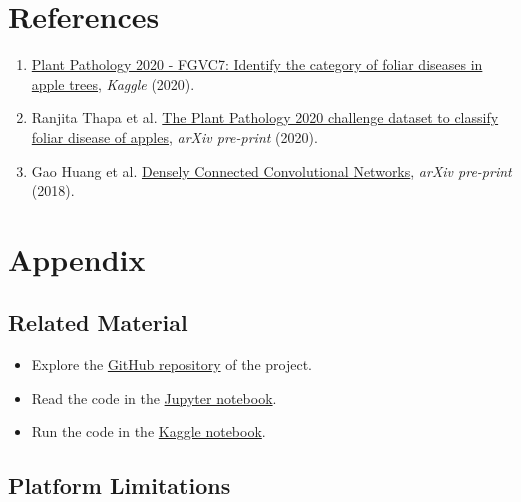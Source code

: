 \documentclass{acm_proc_article-sp}
\providecommand{\tightlist}{%
  \setlength{\itemsep}{0pt}\setlength{\parskip}{0pt}}
\begin{document}
\hypertarget{references}{%
\section{References}\label{references}}

\begin{enumerate}
\def\labelenumi{\arabic{enumi}.}
\tightlist
\item
  \href{https://www.kaggle.com/c/plant-pathology-2020-fgvc7}{Plant
  Pathology 2020 - FGVC7: Identify the category of foliar diseases in
  apple trees}, \emph{Kaggle} (2020).
\item
  Ranjita Thapa et al. \href{https://arxiv.org/abs/2004.11958}{The Plant
  Pathology 2020 challenge dataset to classify foliar disease of
  apples}, \emph{arXiv pre-print} (2020).
\item
  Gao Huang et al. \href{https://arxiv.org/abs/1608.06993}{Densely
  Connected Convolutional Networks}, \emph{arXiv pre-print} (2018).
\end{enumerate}

\hypertarget{appendix}{%
\section{Appendix}\label{appendix}}

\hypertarget{additional-material}{%
\subsection{Related Material}\label{additional-material}}

\begin{itemize}
\tightlist
\item
  Explore the
  \href{https://github.com/InPhyT/NeuralNetworksProject}{GitHub
  repository} of the project.
\item
  Read the code in the
  \href{https://nbviewer.jupyter.org/github/InPhyT/NeuralNetworksProject/notebook.ipynb}{Jupyter
  notebook}.
\item
  Run the code in the
  \href{https://www.kaggle.com/inphyt2020/neuralnetworksproject}{Kaggle
  notebook}.
\end{itemize}

\hypertarget{platform-limitations}{%
\subsection{Platform Limitations}\label{platform-limitations}}
\end{document}
